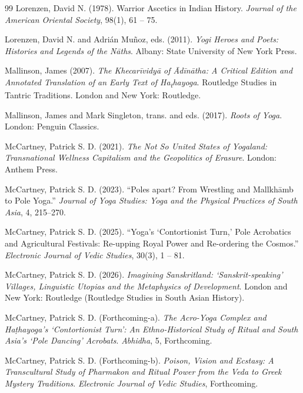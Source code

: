 \documentclass[11pt,twoside,letterpaper]{article}
\begin{document}
\begin{thebibliography}{99}
Lorenzen, David N. (1978). Warrior Ascetics in Indian History. \textit{Journal of the American Oriental Society}, 98(1), 61 -- 75.

Lorenzen, David N. and Adrián Muñoz, eds. (2011). \textit{Yogi Heroes and Poets: Histories and Legends of the Nāths}. Albany: State University of New York Press.

Mallinson, James (2007). \textit{The Khecarīvidyā of Ādīnātha: A Critical Edition and Annotated Translation of an Early Text of Ha\textsubscript{t}hayoga}. Routledge Studies in Tantric Traditions. London and New York: Routledge.

Mallinson, James and Mark Singleton, trans. and eds. (2017). \textit{Roots of Yoga}. London: Penguin Classics.

McCartney, Patrick S. D. (2021). \textit{The Not So United States of Yogaland: Transnational Wellness Capitalism and the Geopolitics of Erasure}. London: Anthem Press.

McCartney, Patrick S. D. (2023). ``Poles apart? From Wrestling and Mallkhāmb to Pole Yoga.'' \textit{Journal of Yoga Studies: Yoga and the Physical Practices of South Asia}, 4, 215–270.

McCartney, Patrick S. D. (2025). ``Yoga's `Contortionist Turn,' Pole Acrobatics and Agricultural Festivals: Re-upping Royal Power and Re-ordering the Cosmos.'' \textit{Electronic Journal of Vedic Studies}, 30(3), 1 -- 81.

McCartney, Patrick S. D. (2026). \textit{Imagining Sanskritland: `Sanskrit-speaking' Villages, Linguistic Utopias and the Metaphysics of Development}. London and New York: Routledge (Routledge Studies in South Asian History).

McCartney, Patrick S. D. (Forthcoming-a). \textit{The Acro-Yoga Complex and Haṭhayoga's `Contortionist Turn': An Ethno-Historical Study of Ritual and South Asia's `Pole Dancing' Acrobats}. \textit{Abhidha}, 5, Forthcoming.

McCartney, Patrick S. D. (Forthcoming-b). \textit{Poison, Vision and Ecstasy: A Transcultural Study of Pharmakon and Ritual Power from the Veda to Greek Mystery Traditions}. \textit{Electronic Journal of Vedic Studies}, Forthcoming.


\end{thebibliography}
\end{document}
